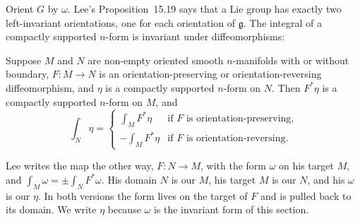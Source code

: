 Orient $G$ by $\omega$. Lee's Proposition~15.19 says that a Lie group has
exactly two left-invariant orientations, one for each orientation of
$\mathfrak g$. The integral of a compactly supported $n$-form is invariant
under diffeomorphisms:
\begin{proposition}\label{haar:prop:lee-16-6}
Suppose $M$ and $N$ are non-empty oriented smooth $n$-manifolds with or
without boundary, $F\colon M\to N$ is an orientation-preserving or
orientation-reversing diffeomorphism, and $\eta$ is a compactly supported
$n$-form on $N$. Then $F^*\eta$ is a compactly supported $n$-form on $M$, and
\begin{equation}\label{haar:diffeo-invariance}
 \int_N\eta=\begin{cases}\int_MF^*\eta&\text{if $F$ is orientation-preserving,}\\
 -\int_MF^*\eta&\text{if $F$ is orientation-reversing.}\end{cases}
\end{equation}
\end{proposition}
Lee writes the map the other way, $F\colon N\to M$, with the form $\omega$ on
his target $M$, and $\int_M\omega=\pm\int_NF^*\omega$. His domain $N$ is our
$M$, his target $M$ is our $N$, and his $\omega$ is our $\eta$. In both
versions the form lives on the target of $F$ and is pulled back to its
domain. We write $\eta$ because $\omega$ is the invariant form of this
section.

